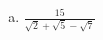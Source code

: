 \documentclass[a4paper,14pt]{article}
\begin{document}
\begin{multicols}{2}
\begin{enumerate}
\begin{enumerate}[a)]
            	\item $\frac{15}{\sqrt{2}+\sqrt{5}-\sqrt{7}}$\\\\\\\\\\\\\\\\
            \end{enumerate}
        $~$ \\ $~$ \\ $~$ \\ $~$ \\ $~$ \\ $~$ \\ $~$ \\ $~$ \\ $~$ \\ $~$ \\ $~$ \\ $~$ \\ $~$ \\ $~$ \\ $~$ \\ $~$ \\ $~$ \\ $~$ \\ $~$$~$ \\ $~$ \\ $~$ \\ $~$ \\ $~$ \\ $~$ \\ $~$ \\ $~$ \\ $~$ \\ $~$
  	    \end{enumerate}
    \end{multicols}
\end{document}
